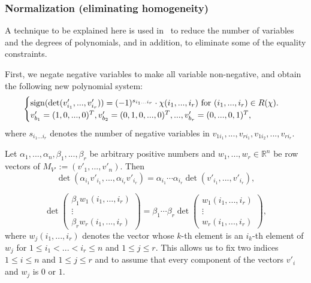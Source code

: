 \documentclass{article}
\begin{document}
\subsubsection{Normalization (eliminating homogeneity)} \label{Normalization}
A technique to be explained here is used in~\cite{N07,NMF07} to reduce the number of variables and the degrees
of polynomials, and in addition, to eliminate some of the equality constraints.

First, we negate negative variables to make all variable non-negative,
and obtain the following new polynomial system:
\begin{align*}
\begin{cases}
{\rm sign}(\det(v'_{i_{1}},...,v'_{i_{r}})) = (-1)^{s_{i_{1}...i_{r}}} \cdot \chi (i_{1},...,i_{r}) \text{ for $(i_{1},...,i_{r}) \in R(\chi ).$} \\
v'_{b_{1}}=(1,0,...,0)^{T},v'_{b_{2}}=(0,1,0,...,0)^{T},...,v'_{b_{r}}=(0,...,0,1)^{T}, 
\end{cases}
\end{align*}
where $s_{i_{1}...i_{r}}$ denotes the number of negative variables in $v_{1i_{1}},...,v_{ri_{1}},v_{1i_{2}},...,v_{ri_{r}}$.

Let $\alpha_{1},...,\alpha_{n},\beta_{1},...,\beta_{r}$ be arbitrary positive numbers and
$w_{1},...,w_{r} \in \mathbb{R}^{n}$ be row vectors of $M_{V'}:=(v'_{1},...,v'_{n})$.
Then
\[ \det(\alpha_{i_{1}}v'_{i_{1}},...,\alpha_{i_{r}}v'_{i_{r}})=\alpha_{i_{1}} \cdots \alpha_{i_{r}}\det(v'_{i_{1}},...,v'_{i_{r}}), \]

\[ \det
\begin{pmatrix}
\beta_{1}w_{1}(i_{1},...,i_{r})\\
\vdots \\
\beta_{r}w_{r}(i_{1},...,i_{r})
\end{pmatrix}
=
\beta_{1}\cdots \beta_{r}
\det
\begin{pmatrix}
w_{1}(i_{1},...,i_{r})\\
\vdots \\
w_{r}(i_{1},...,i_{r})
\end{pmatrix},\]
where $w_{j}(i_{1},...,i_{r})$ denotes the vector whose $k$-th element is an $i_k$-th element of $w_{j}$ for $1 \leq i_1 < ... < i_r \leq n$
and $1 \leq j \leq r$.
This allows us to
fix two indices $1 \leq i \leq n$ and $1 \leq j \leq r$ 
and to assume that every component of the vectors $v'_{i}$ and $w_{j}$ is $0$ or $1$.
\end{document}
